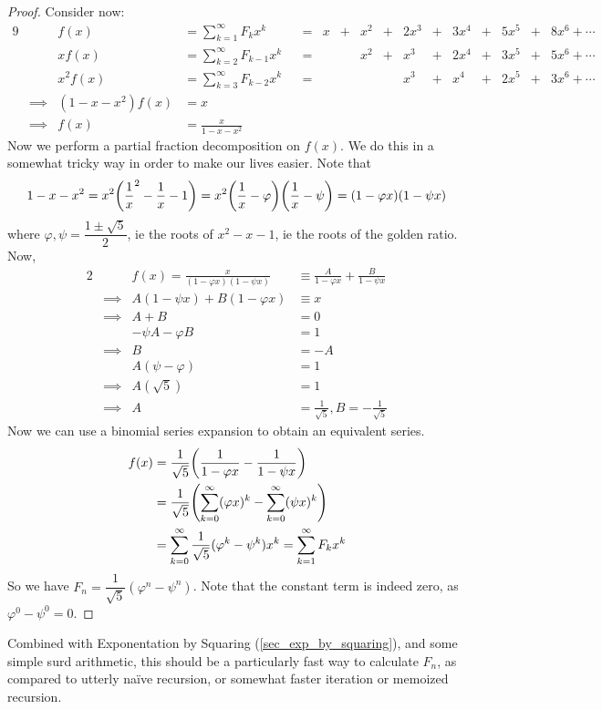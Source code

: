 \begin{proof}
Consider now:
\begin{alignat*}9
&& f(x) &= \sum_{k = 1}^\infty F_k x^k
    &&={}& x &+{}& x^2 &+{}& 2x^3 &+{}&
        3x^4 &+{}& 5x^5 &+{}& 8x^6 + \dotsb \\
&& x f(x) &= \sum_{k = 2}^\infty F_{k - 1} x^k
    &&={}& &&x^2 &+{}& x^3 &+{}& 2x^4 &+{}&
        3x^5 &+{}& 5x^6 + \dotsb \\
&& x^2 f(x) &= \sum_{k = 3}^\infty F_{k - 2}x^k
    &&={}& &&&& x^3 &+{}& x^4 &+{}& 2x^5 &+{}& 3x^6 + \dotsb \\
&\implies& (1 - x - x^2) f(x) &= x \\
&\implies& f(x) &= \frac x{1 - x - x^2}
\end{alignat*}
Now we perform a partial fraction decomposition on \(f(x)\). We do this in a
somewhat tricky way in order to make our lives easier. Note that
\begin{equation*}
1 - x - x^2 = x^2 \pqty{\frac 1x^2 - \frac 1x - 1}
    = x^2\pqty{\frac 1x - \varphi}\pqty{\frac 1x - \psi}
    = (1 - \varphi x)(1 - \psi x)
\end{equation*}
where \(\varphi, \psi = \dfrac{1 \pm \sqrt 5}2\), ie the roots of
\(x^2 - x - 1\), ie the roots of the golden ratio. Now,
\begin{alignat*}2
&& f(x) = \frac x{(1 - \varphi x)(1 - \psi x)}
    &\equiv \frac A{1 - \varphi x} + \frac B{1 - \psi x} \\
&\implies& A(1 - \psi x) + B(1 - \varphi x) &\equiv x \\
&\implies& A + B &= 0 \\
&& -\psi A - \varphi B &= 1 \\
&\implies& B &= -A  \\
&& A(\psi - \varphi) &= 1 \\
&\implies& A(\sqrt 5) &= 1 \\
&\implies& A &= \frac 1{\sqrt 5}, B = -\frac 1{\sqrt 5}
\end{alignat*}
Now we can use a binomial series expansion to obtain an equivalent series.
\begin{align*}
f(x) &= \frac 1{\sqrt 5}\pqty{\frac 1{1 - \varphi x}
                            - \frac 1{1 - \psi x}} \\
&= \frac 1{\sqrt 5}\pqty{\sum_{k = 0}^\infty (\varphi x)^k
                       - \sum_{k = 0}^\infty (\psi x)^k} \\
&= \sum_{k = 0}^\infty \frac 1{\sqrt 5}(\varphi^k - \psi^k)x^k
= \sum_{k = 1}^\infty F_k x^k
\end{align*}
So we have \(F_n = \dfrac 1{\sqrt 5}(\varphi^n - \psi^n)\). Note that the
constant term is indeed zero, as \(\varphi^0 - \psi^0 = 0\).
\end{proof}
Combined with Exponentation by Squaring (\ref{sec_exp_by_squaring}), and
some simple surd arithmetic, this should be a particularly fast way to
calculate \(F_n\), as compared to utterly na\"ive recursion, or somewhat
faster iteration or memoized recursion.

